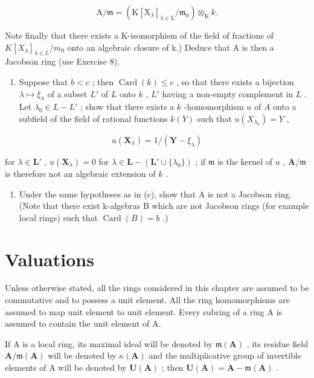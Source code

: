 \[
\mathrm{A} / \mathfrak {m} = (\mathrm{K} [ \mathrm{X} _ {\lambda} ] _ {\lambda \in \mathrm{L}} / \mathfrak {m} _ {0}) \otimes_ {\mathrm{K}} k.
\]

Note finally that there exists a K-isomorphism of the field of fractions of \(K[X_{\lambda}]_{\lambda \in L}/m_{0}\) onto an algebraic closure of k.) Deduce that A is then a Jacobson ring (use Exercise 8).

\begin{enumerate}
\def\labelenumi{(\alph{enumi})}
\setcounter{enumi}{2}
\tightlist
\item
  Suppose that \(b < c\) ; then \(\operatorname{Card}(k) \leqslant c\) , so that there exists a bijection \(\lambda \mapsto \xi_{\lambda}\) of a subset \(L'\) of \(L\) onto \(k\) , \(L'\) having a non-empty complement in \(L\) . Let \(\lambda_0 \in L - L'\) ; show that there exists a \(k\) -homomorphism \(u\) of \(A\) onto a subfield of the field of rational functions \(k(Y)\) such that \(u(X_{\lambda_0}) = Y\) ,
\end{enumerate}

\[
u (\mathbf {X} _ {\lambda}) = 1 / (\mathbf {Y} - \xi_ {\lambda})
\]

for \(\lambda \in \mathbf{L}'\) , \(u(\mathbf{X}_{\lambda}) = 0\) for \(\lambda \in \mathbf{L} - (\mathbf{L}' \cup \{\lambda_0\})\) ; if \(\mathfrak{m}\) is the kernel of \(u\) , \(\mathbf{A} / \mathfrak{m}\) is therefore not an algebraic extension of \(k\) .

\begin{enumerate}
\def\labelenumi{(\alph{enumi})}
\setcounter{enumi}{3}
\tightlist
\item
  Under the same hypotheses as in (c), show that A is not a Jacobson ring. (Note that there exist k-algebras B which are not Jacobson rings (for example local rings) such that \(\operatorname{Card}(B) = b\) .)
\end{enumerate}


\chapter{Valuations}

Unless otherwise stated, all the rings considered in this chapter are assumed to be commutative and to possess a unit element. All the ring homomorphisms are assumed to map unit element to unit element. Every subring of a ring A is assumed to contain the unit element of A.

If A is a local ring, its maximal ideal will be denoted by \(\mathfrak{m}(\mathbf{A})\) , its residue field \(\mathbf{A}/\mathfrak{m}(\mathbf{A})\) will be denoted by \(\kappa(\mathbf{A})\) and the multiplicative group of invertible elements of A will be denoted by \(\mathbf{U}(\mathbf{A})\) ; then \(\mathbf{U}(\mathbf{A}) = \mathbf{A} - \mathfrak{m}(\mathbf{A})\) .

